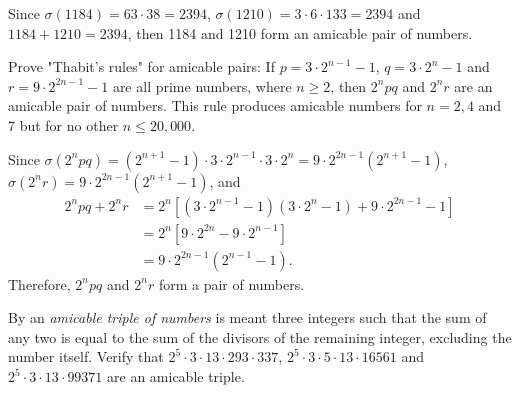 \begin{solution}
    Since $\sigma(1184) = 63\cdot 38 = 2394$, $\sigma(1210) = 3\cdot 6 \cdot 133 = 2394$ and $1184 + 1210 = 2394$, then 1184 and 1210 form an amicable pair of numbers.\\
\end{solution}

\begin{exercise}
    Prove "Thabit's rules" for amicable pairs: If $p = 3\cdot 2^{n-1} - 1$, $q = 3\cdot 2^n - 1$ and $r = 9 \cdot 2^{2n - 1} - 1$ are all prime numbers, where $n \geq 2$, then $2^npq$ and $2^nr$ are an amicable pair of numbers. This rule produces amicable numbers for $n = 2,4$ and 7 but for no other $n \leq 20,000$. \\
\end{exercise}

\begin{solution}
    Since $\sigma(2^npq) = (2^{n+1} - 1)\cdot 3 \cdot 2^{n-1}\cdot 3\cdot 2^n = 9 \cdot 2^{2n-1}(2^{n+1} - 1)$, $\sigma(2^nr) = 9\cdot 2^{2n-1}(2^{n+1} - 1)$, and
    \begin{align*}
        2^npq + 2^nr &= 2^n\left[(3\cdot 2^{n-1} - 1)(3\cdot 2^n - 1) + 9\cdot 2^{2n-1} - 1\right] \\
        &= 2^n\left[9\cdot 2^{2n} - 9\cdot 2^{n-1}\right] \\
        &= 9\cdot 2^{2n-1} (2^{n-1} - 1).
    \end{align*}
    Therefore, $2^npq$ and $2^n r$ form a pair of numbers. \\
\end{solution}

\begin{exercise}
    By an \textit{amicable triple of numbers} is meant three integers such that the sum of any two is equal to the sum of the divisors of the remaining integer, excluding the number itself. Verify that $2^5\cdot 3 \cdot 13 \cdot 293 \cdot 337$, $2^5 \cdot 3 \cdot 5 \cdot 13 \cdot 16561$ and $2^5 \cdot 3 \cdot 13 \cdot 99371$ are an amicable triple. \\
\end{exercise}


